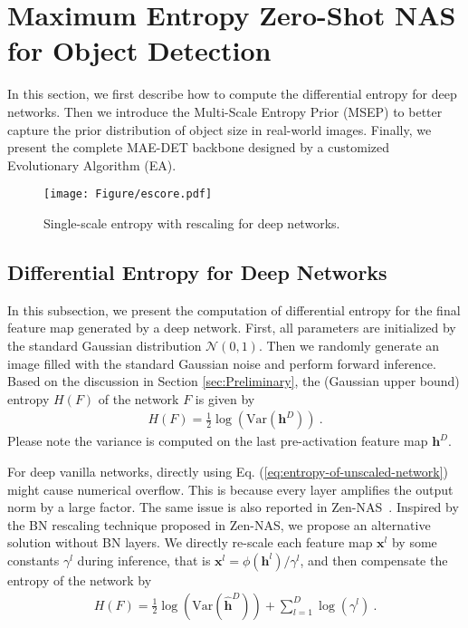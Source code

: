\documentclass[nohyperref]{article}
\theoremstyle{plain}
\theoremstyle{definition}
\theoremstyle{remark}
\begin{document}
\section{Maximum Entropy Zero-Shot NAS for Object Detection}

In this section, we first describe how to compute the differential entropy for deep networks. Then we introduce the Multi-Scale Entropy Prior (MSEP) to better capture the prior distribution of object size in real-world images. Finally, we present the complete MAE-DET backbone designed by a customized Evolutionary Algorithm (EA).

\begin{figure}[htb]
	\centering
	\texttt{[image: Figure/escore.pdf]}
	\caption{Single-scale entropy with rescaling for deep networks.}
	\label{fig:escore}	
\end{figure}

\subsection{Differential Entropy for Deep Networks}
In this subsection, we present the computation of differential entropy for the final feature map generated by a deep network. First, all parameters are initialized by the standard Gaussian distribution $\mathcal{N}(0,1)$. Then we randomly generate an image filled with the standard Gaussian noise and perform forward inference. Based on the discussion in Section \ref{sec:Preliminary}, the (Gaussian upper bound) entropy $H(F)$ of the network $F$ is given by
\begin{align}
	\label{eq:entropy-of-unscaled-network}
	H(F) = \frac{1}{2} \log( \mathrm{Var}( \boldsymbol{h}^D)) \ . 
\end{align}
Please note the variance is computed on the last pre-activation feature map $\boldsymbol{h}^D$.

For deep vanilla networks, directly using Eq. (\ref{eq:entropy-of-unscaled-network}) might cause numerical overflow. This is because every layer amplifies the output norm by a large factor. The same issue is also reported in Zen-NAS~\citep{zennas}. Inspired by the BN rescaling technique proposed in Zen-NAS, we propose an alternative solution without BN layers. We directly re-scale each feature map $\boldsymbol{x}^l$ by some constants $\gamma^l$ during inference, that is ${\boldsymbol {x}}^{l} =  \phi({\boldsymbol {h}}^{l}) / \gamma^l$, and then compensate the entropy of the network by
\begin{align}
	\label{eq:entropy-of-rescaled-network}
	H(F) = \frac{1}{2} \log( \mathrm{Var}( \boldsymbol{\hat h}^D)) + \sum_{l=1}^{D} \log(\gamma^l) \ . 
\end{align}
 
\end{document}

